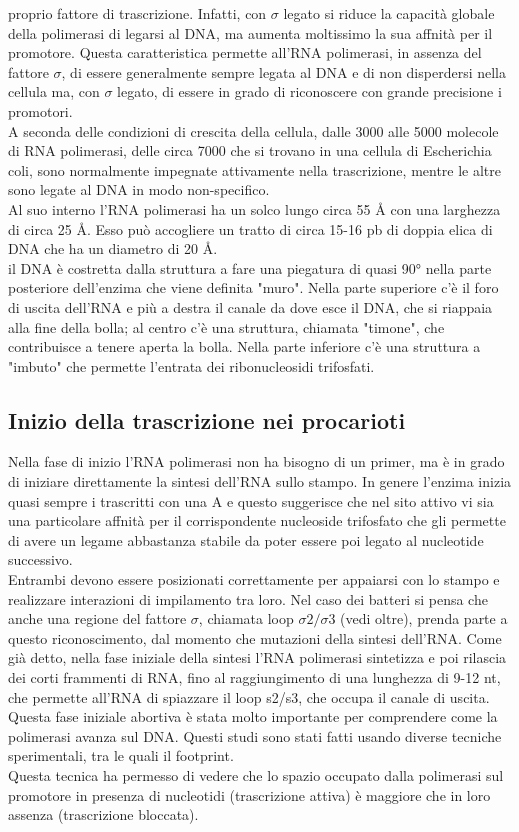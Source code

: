 \documentclass{article}
\begin{document}
proprio fattore di trascrizione. Infatti, con $\sigma$ legato si riduce la capacità globale
della polimerasi di legarsi al DNA, ma aumenta moltissimo la sua affnità per
il promotore. Questa caratteristica permette all'RNA polimerasi, in assenza del
fattore $\sigma$, di essere generalmente sempre legata al DNA e di non disperdersi nella
cellula ma, con $\sigma$ legato, di essere in grado di riconoscere con grande precisione
i promotori.\\
A seconda delle condizioni di crescita della cellula, dalle 3000 alle
5000 molecole di RNA polimerasi, delle circa 7000 che si trovano in una cellula
di Escherichia coli, sono normalmente impegnate attivamente nella trascrizione,
mentre le altre sono legate al DNA in modo non-specifico.\\
Al suo interno l'RNA polimerasi ha un solco lungo circa 55 Å con una larghezza di circa 25 Å. Esso può accogliere un tratto di circa 15-16 pb di doppia
elica di DNA che ha un diametro di 20 Å.\\
il DNA è costretta dalla struttura a fare una piegatura di quasi 90° nella parte posteriore dell'enzima
che viene definita "muro". Nella parte superiore c'è il foro di uscita dell'RNA e
più a destra il canale da dove esce il DNA, che si riappaia alla fine della bolla; al
centro c'è una struttura, chiamata "timone", che contribuisce a tenere aperta la
bolla. Nella parte inferiore c'è una struttura a "imbuto" che permette l'entrata
dei ribonucleosidi trifosfati.
\subsection{Inizio della trascrizione nei procarioti}
Nella fase di inizio l'RNA polimerasi non ha bisogno di un primer, ma è in
grado di iniziare direttamente la sintesi dell'RNA sullo stampo. In genere l'enzima inizia quasi sempre i trascritti con una A e questo suggerisce che nel sito
attivo vi sia una particolare affnità per il corrispondente nucleoside trifosfato
che gli permette di avere un legame abbastanza stabile da poter essere poi legato
al nucleotide successivo.\\
Entrambi devono essere posizionati correttamente per
appaiarsi con lo stampo e realizzare interazioni di impilamento tra loro. Nel caso
dei batteri si pensa che anche una regione del fattore $\sigma$, chiamata loop $\sigma 2/ \sigma 3$
(vedi oltre), prenda parte a questo riconoscimento, dal momento che mutazioni della sintesi dell'RNA.
Come già detto, nella fase iniziale della sintesi l'RNA polimerasi sintetizza
e poi rilascia dei corti frammenti di RNA, fino al raggiungimento di una lunghezza di 9-12 nt, che permette all'RNA di spiazzare il loop s2/s3, che occupa
il canale di uscita. Questa fase iniziale abortiva è stata molto importante per
comprendere come la polimerasi avanza sul DNA. Questi studi sono stati fatti
usando diverse tecniche sperimentali, tra le quali il footprint.\\
Questa tecnica ha permesso di vedere che lo spazio occupato dalla polimerasi sul
promotore in presenza di nucleotidi (trascrizione attiva) è maggiore che in loro
assenza (trascrizione bloccata).
\end{document}
